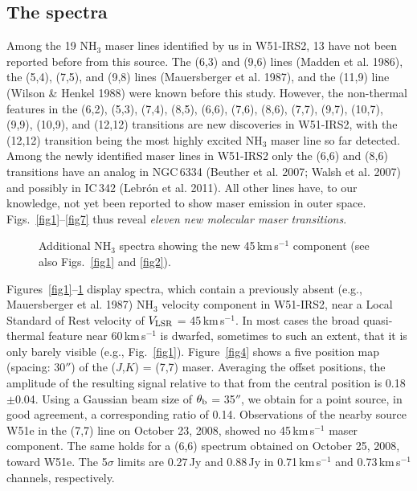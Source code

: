 \documentclass[oldversion]{aa}
\begin{document}
\subsection{The spectra}

Among the 19 NH$_3$ maser lines identified by us in W51-IRS2,
13 have not been reported before from this source. The (6,3) 
and (9,6) lines (Madden et al. 1986), the (5,4), (7,5), and 
(9,8) lines (Mauersberger et al. 1987), and the (11,9) line 
(Wilson \& Henkel 1988) were known before this study. 
However, the non-thermal features in the (6,2), (5,3), (7,4), 
(8,5), (6,6), (7,6), (8,6), (7,7), (9,7), (10,7), (9,9), (10,9), 
and (12,12) transitions are new discoveries in W51-IRS2, with 
the (12,12) transition being the most highly excited NH$_3$ maser 
line so far detected. Among the newly identified maser lines 
in W51-IRS2 only the (6,6) and (8,6) transitions have an analog 
in NGC\,6334 (Beuther et al. 2007; Walsh et al. 2007) and 
possibly in IC\,342 (Lebr{\'o}n et al. 2011). All other lines 
have, to our knowledge, not yet been reported to show maser 
emission in outer space. Figs.~\ref{fig1}--\ref{fig7} thus reveal 
{\it eleven new molecular maser transitions}.

 
\begin{figure}[t]
\vspace{0.0cm}
\centering
{}
\vspace{-0.7cm}
\caption{Additional NH$_3$ spectra showing the new 45\,km\,s$^{-1}$ 
component (see also Figs.~\ref{fig1} and \ref{fig2}). 
\label{fig3}}
\end{figure}


Figures~\ref{fig1}--\ref{fig3} display spectra, which contain 
a previously absent (e.g., Mauersberger et al. 1987) NH$_3$ velocity 
component in W51-IRS2, near a Local Standard of Rest velocity of 
$V_{\rm LSR}$ = 45\,km\,s$^{-1}$. In most cases the broad quasi-thermal 
feature near 60\,km\,s$^{-1}$ is dwarfed, sometimes to such an 
extent, that it is only barely visible (e.g., Fig.~\ref{fig1}). 
Figure~\ref{fig4} shows a five position map (spacing: 30$''$) of 
the ($J$,$K$) = (7,7) maser. Averaging the offset positions, the 
amplitude of the resulting signal relative to that from the central
position is 0.18$\pm$0.04. Using a Gaussian beam size of $\theta_{\rm b}$
= 35$''$, we obtain for a point source, in good agreement, 
a corresponding ratio of 0.14. Observations of the nearby source W51e 
in the (7,7) line on October 23, 2008, showed no 45\,km\,s$^{-1}$ maser 
component. The same holds for a (6,6) spectrum obtained on October 25, 
2008, toward W51e. The 5$\sigma$ limits are 0.27\,Jy and 0.88\,Jy in 
0.71\,km\,s$^{-1}$ and 0.73\,km\,s$^{-1}$ channels, respectively.
\end{document}
